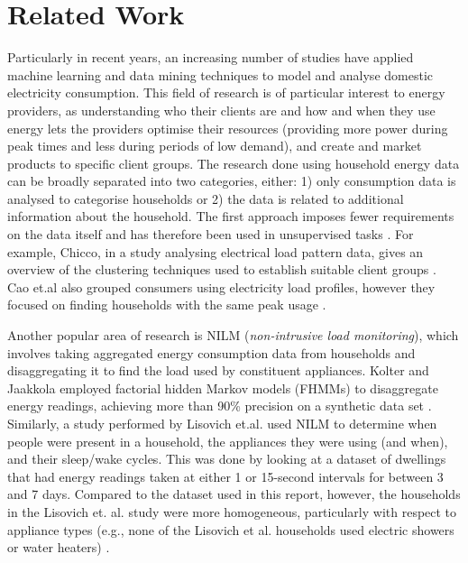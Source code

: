 \section{Related Work}
\label{sec:previousWork}
Particularly in recent years, an increasing number of studies have applied machine learning and data mining techniques to model and analyse domestic electricity consumption. This field of research is of particular interest to energy providers, as understanding who their clients are and how and when they use energy lets the providers optimise their resources (providing more power during peak times and less during periods of low demand), and create and market products to specific client groups. The research done using household energy data can be broadly separated into two categories, either: 1) only consumption data is analysed to categorise households or 2) the data is related to additional information about the household. The first approach imposes fewer requirements on the data itself and has therefore been used in unsupervised tasks \cite{Beckel_3}. For example, Chicco, in a study analysing electrical load pattern data, gives an overview of the clustering techniques used to establish suitable client groups \cite{Chicco}. Cao et.al also grouped consumers using electricity load profiles, however they focused on finding households with the same peak usage \cite{Cao}. 


Another popular area of research is NILM (\textit{non-intrusive load monitoring}), which involves taking aggregated energy consumption data from households and disaggregating it to find the load used by constituent appliances. Kolter and Jaakkola employed factorial hidden Markov models (FHMMs) to disaggregate energy readings, achieving more than 90\% precision on a synthetic data set \cite{Kolter}. Similarly, a study performed by Lisovich et.al. used NILM to determine when people were present in a household, the appliances they were using (and when), and their sleep/wake cycles. This was done by looking at a dataset of dwellings that had energy readings taken at either 1 or 15-second intervals for between 3 and 7 days. Compared to the dataset used in this report, however, the households in the Lisovich et. al. study were more homogeneous, particularly with respect to appliance types (e.g., none of the Lisovich et al. households used electric showers or water heaters) \cite{LMW}.


